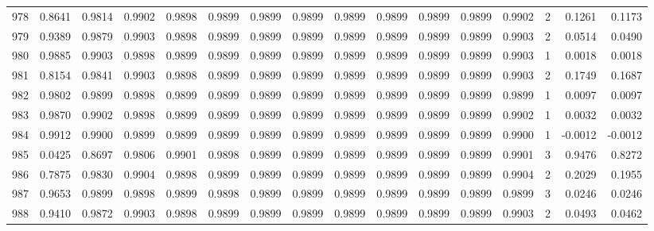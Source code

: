 \begin{tabular}{lrrrrrrrrrrrrrrr}
978 &      0.8641 &  0.9814 &  0.9902 &  0.9898 &  0.9899 &  0.9899 &  0.9899 &  0.9899 &  0.9899 &  0.9899 &   0.9899 &     0.9902 &      2 &                    0.1261 &                     0.1173 \\
979 &      0.9389 &  0.9879 &  0.9903 &  0.9898 &  0.9899 &  0.9899 &  0.9899 &  0.9899 &  0.9899 &  0.9899 &   0.9899 &     0.9903 &      2 &                    0.0514 &                     0.0490 \\
980 &      0.9885 &  0.9903 &  0.9898 &  0.9899 &  0.9899 &  0.9899 &  0.9899 &  0.9899 &  0.9899 &  0.9899 &   0.9899 &     0.9903 &      1 &                    0.0018 &                     0.0018 \\
981 &      0.8154 &  0.9841 &  0.9903 &  0.9898 &  0.9899 &  0.9899 &  0.9899 &  0.9899 &  0.9899 &  0.9899 &   0.9899 &     0.9903 &      2 &                    0.1749 &                     0.1687 \\
982 &      0.9802 &  0.9899 &  0.9898 &  0.9899 &  0.9899 &  0.9899 &  0.9899 &  0.9899 &  0.9899 &  0.9899 &   0.9899 &     0.9899 &      1 &                    0.0097 &                     0.0097 \\
983 &      0.9870 &  0.9902 &  0.9898 &  0.9899 &  0.9899 &  0.9899 &  0.9899 &  0.9899 &  0.9899 &  0.9899 &   0.9899 &     0.9902 &      1 &                    0.0032 &                     0.0032 \\
984 &      0.9912 &  0.9900 &  0.9899 &  0.9899 &  0.9899 &  0.9899 &  0.9899 &  0.9899 &  0.9899 &  0.9899 &   0.9899 &     0.9900 &      1 &                   -0.0012 &                    -0.0012 \\
985 &      0.0425 &  0.8697 &  0.9806 &  0.9901 &  0.9898 &  0.9899 &  0.9899 &  0.9899 &  0.9899 &  0.9899 &   0.9899 &     0.9901 &      3 &                    0.9476 &                     0.8272 \\
986 &      0.7875 &  0.9830 &  0.9904 &  0.9898 &  0.9899 &  0.9899 &  0.9899 &  0.9899 &  0.9899 &  0.9899 &   0.9899 &     0.9904 &      2 &                    0.2029 &                     0.1955 \\
987 &      0.9653 &  0.9899 &  0.9898 &  0.9899 &  0.9898 &  0.9899 &  0.9899 &  0.9899 &  0.9899 &  0.9899 &   0.9899 &     0.9899 &      3 &                    0.0246 &                     0.0246 \\
988 &      0.9410 &  0.9872 &  0.9903 &  0.9898 &  0.9899 &  0.9899 &  0.9899 &  0.9899 &  0.9899 &  0.9899 &   0.9899 &     0.9903 &      2 &                    0.0493 &                     0.0462 \\

\end{tabular}
